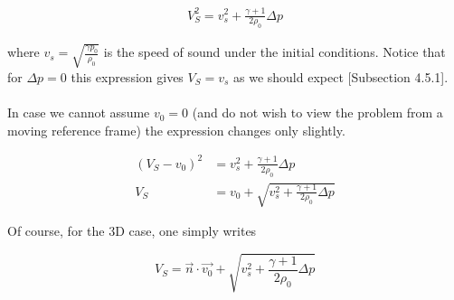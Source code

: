 \begin{equation}
\label{eq:Riemann-solution}
\begin{split}
V_S^2 = v_s^2 + \frac{\gamma + 1}{2 \rho_0} \Delta p
\end{split}
\end{equation}

where $v_s = \sqrt{\frac{\gamma p_0}{\rho_0}}$ is the speed of sound under the initial conditions. Notice that for $\Delta p = 0$ this expression gives $V_S = v_s$ as we should expect \cite{notes-principles-MHD}[Subsection 4.5.1].\\
\\
In case we cannot assume $v_0 = 0$ (and do not wish to view the problem from a moving reference frame) the expression changes only slightly.

\begin{equation}
\label{eq:Riemann-solution2}
\begin{split}
(V_S - v_0)^2 &= v_s^2 + \frac{\gamma + 1}{2 \rho_0} \Delta p \\
V_S &= v_0 + \sqrt{v_s^2 + \frac{\gamma + 1}{2 \rho_0} \Delta p}
\end{split}
\end{equation}

Of course, for the 3D case, one simply writes

\begin{equation}
\label{eq:Riemann-solution-3D}
V_S = \vec{n} \cdot \vec{v_0} + \sqrt{v_s^2 + \frac{\gamma + 1}{2 \rho_0} \Delta p}
\end{equation}

